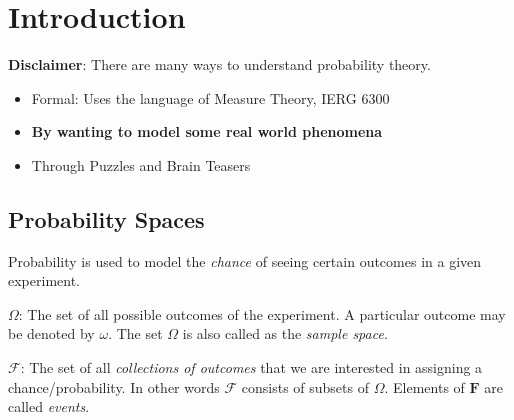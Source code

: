 \chapter{Introduction}
\textbf{Disclaimer}: There are many ways to understand probability theory.
\begin{itemize}
    \item Formal: Uses the language of Measure Theory, IERG 6300
    \item \textbf{By wanting to model some real world phenomena}
    \item Through Puzzles and Brain Teasers
\end{itemize}
\section{Probability Spaces}
Probability is used to model the \textit{chance} of seeing certain outcomes in a given experiment.

\textbf{$\Omega$}: The set of all possible outcomes of the experiment. A particular outcome may be denoted by $\omega$. The set $\Omega$ is also called as the \textit{sample space}.

\textbf{$\mathcal{F}$}: The set of all \textit{collections of outcomes} that we are interested in assigning a chance/probability. In other words $\mathcal{F}$ consists of subsets of $\Omega$. Elements of $\mathbf{F}$ are called \textit{events}.

